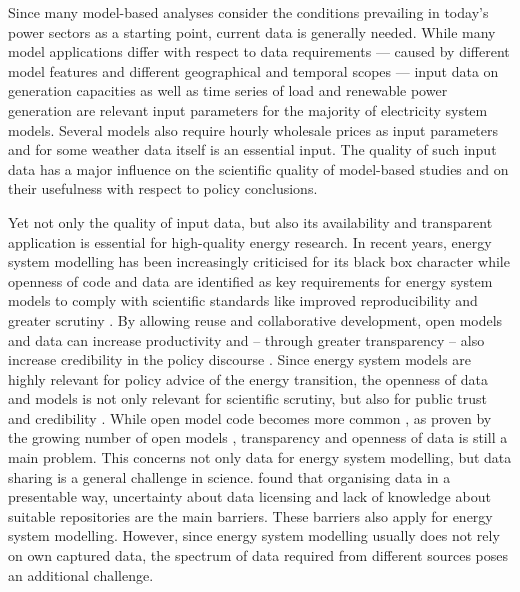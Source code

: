 \documentclass[article,sort&compress]{elsarticle}
\begin{document}
Since many model-based analyses consider the conditions prevailing in today's power sectors as a starting point, current data is generally needed. While many model applications differ with respect to data requirements --- caused by different model features and different geographical and temporal scopes --- input data on generation capacities as well as time series of load and renewable power generation are relevant input parameters for the majority of electricity system models. Several models also require hourly wholesale prices as input parameters and for some weather data itself is an essential input. The quality of such input data has a major influence on the scientific quality of model-based studies and on their usefulness with respect to policy conclusions.

Yet not only the quality of input data, but also its availability and transparent application is essential for high-quality energy research. In recent years, energy system modelling has been increasingly criticised for its black box character \cite{Pfenninger2017,Pfenninger2018} while openness of code and data are identified as key requirements for energy system models to comply with scientific standards like improved reproducibility and greater scrutiny \cite{Wiese2018}. By allowing reuse and collaborative development, open models and data can increase productivity and -- through greater transparency \cite{Cao2016} -- also increase credibility in the policy discourse \cite{Dieckhoff2016,Wiese2014}. Since energy system models are highly relevant for policy advice of the energy transition, the openness of data and models is not only relevant for scientific scrutiny, but also for public trust and credibility \cite{Pfenninger2017b}. While open model code becomes more common \cite{MORRISON2018}, as proven by the growing number of open models \cite{openmod2018}, transparency and openness of data is still a main problem. This concerns not only data for energy system modelling, but data sharing is a general challenge in science. \cite{Stuart2018} found that organising data in a presentable way, uncertainty about data licensing and lack of knowledge about suitable repositories are the main barriers. These barriers also apply for energy system modelling. However, since energy system modelling usually does not rely on own captured data, the spectrum of data required from different sources poses an additional challenge.
\end{document}
